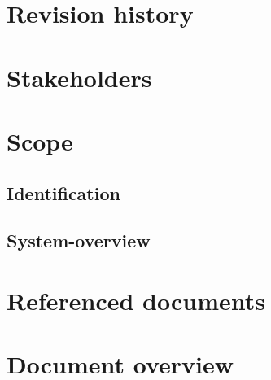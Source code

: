 \documentclass[a4paper, oneside, 11pt]{article}
\begin{document}

\addtolength{\topmargin}{-2cm}
\tableofcontents

\noindent
\vspace{15mm}
\section{Revision history}

\vspace{10mm}
\section{Stakeholders}

\newpage
\section{Scope}

\subsection{Identification}

\subsection{System-overview}

\section{Referenced documents}
\newpage
\section{Document overview}

\end{document}

